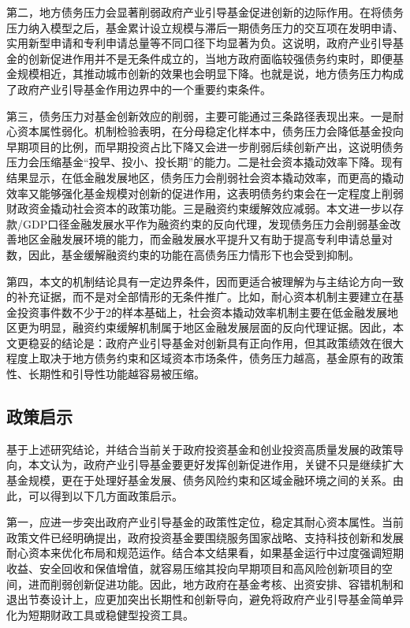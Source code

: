 \documentclass[UTF8,a4paper,zihao=5,fontset=fandol]{ctexart}
\begin{document}
第二，地方债务压力会显著削弱政府产业引导基金促进创新的边际作用。在将债务压力纳入模型之后，基金累计设立规模与滞后一期债务压力的交互项在发明申请、实用新型申请和专利申请总量等不同口径下均显著为负。这说明，政府产业引导基金的创新促进作用并不是无条件成立的，当地方政府面临较强债务约束时，即便基金规模相近，其推动城市创新的效果也会明显下降。也就是说，地方债务压力构成了政府产业引导基金作用边界中的一个重要约束条件。

第三，债务压力对基金创新效应的削弱，主要可能通过三条路径表现出来。一是耐心资本属性弱化。机制检验表明，在分母稳定化样本中，债务压力会降低基金投向早期项目的比例，而早期投资占比下降又会进一步削弱后续创新产出，这说明债务压力会压缩基金“投早、投小、投长期”的能力。二是社会资本撬动效率下降。现有结果显示，在低金融发展地区，债务压力会削弱社会资本撬动效率，而更高的撬动效率又能够强化基金规模对创新的促进作用，这表明债务约束会在一定程度上削弱财政资金撬动社会资本的政策功能。三是融资约束缓解效应减弱。本文进一步以存款/GDP口径金融发展水平作为融资约束的反向代理，发现债务压力会削弱基金改善地区金融发展环境的能力，而金融发展水平提升又有助于提高专利申请总量对数，因此，基金缓解融资约束的功能在高债务压力情形下也会受到抑制。

第四，本文的机制结论具有一定边界条件，因而更适合被理解为与主结论方向一致的补充证据，而不是对全部情形的无条件推广。比如，耐心资本机制主要建立在基金投资事件数不少于2的样本基础上，社会资本撬动效率机制主要在低金融发展地区更为明显，融资约束缓解机制属于地区金融发展层面的反向代理证据。因此，本文更稳妥的结论是：政府产业引导基金对创新具有正向作用，但其政策绩效在很大程度上取决于地方债务约束和区域资本市场条件，债务压力越高，基金原有的政策性、长期性和引导性功能越容易被压缩。

\subsection{政策启示}

基于上述研究结论，并结合当前关于政府投资基金和创业投资高质量发展的政策导向，本文认为，政府产业引导基金要更好发挥创新促进作用，关键不只是继续扩大基金规模，更在于处理好基金发展、债务风险约束和区域金融环境之间的关系。由此，可以得到以下几方面政策启示。

第一，应进一步突出政府产业引导基金的政策性定位，稳定其耐心资本属性。当前政策文件已经明确提出，政府投资基金要围绕服务国家战略、支持科技创新和发展耐心资本来优化布局和规范运作。结合本文结果看，如果基金运行中过度强调短期收益、安全回收和保值增值，就容易压缩其投向早期项目和高风险创新项目的空间，进而削弱创新促进功能。因此，地方政府在基金考核、出资安排、容错机制和退出节奏设计上，应更加突出长期性和创新导向，避免将政府产业引导基金简单异化为短期财政工具或稳健型投资工具。
\end{document}
